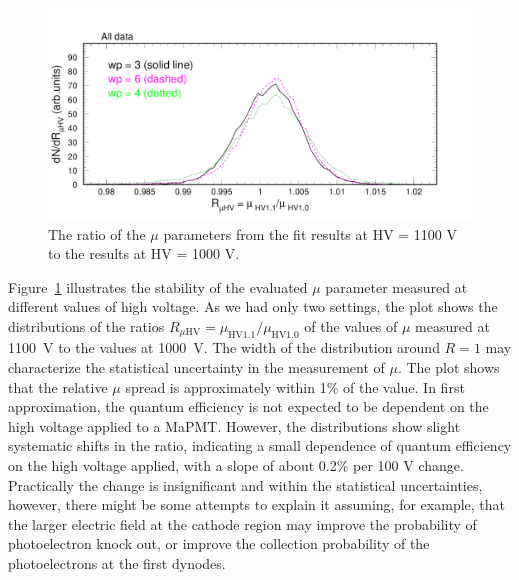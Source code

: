 \begin{figure}[h!]
	\centering
	\includegraphics[width=0.98\linewidth, trim=0 12 50 35, clip]{figures/pglobal_mHV.pdf}
	\caption{The ratio of the $\mu$ parameters from the fit results at HV = 1100 V to the results at HV = 1000 V.}
	\label{fig:pglobal_mHV}
\end{figure}
Figure~\ref{fig:pglobal_mHV} illustrates the stability of the evaluated $\mu$ parameter measured at different values of high voltage. As we had only two settings, the plot shows the distributions of the ratios $R_{\mu\mathrm{HV}} = \mu_{\mathrm{HV1.1}}/\mu_{\mathrm{HV1.0}}$ of the values of $\mu$ measured at 1100~V to the values at 1000~V. The width of the distribution around $R = 1$ may characterize the statistical uncertainty in the measurement of $\mu$. The plot shows that the relative $\mu$ spread is approximately within 1\% of the value. In first approximation, the quantum efficiency is not expected to be dependent on the high voltage applied to a MaPMT. However, the distributions show slight systematic shifts in the ratio, indicating a small dependence of quantum efficiency on the high voltage applied, with a slope of about 0.2\% per 100 V change. Practically the change is insignificant and within the statistical uncertainties, however, there might be some attempts to explain it assuming, for example, that the larger electric field at the cathode region may improve the probability of photoelectron knock out, or improve the collection probability of the photoelectrons at the first dynodes.

